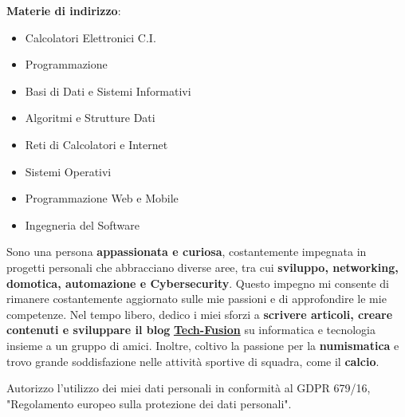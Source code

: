 

\textbf{Materie di indirizzo}: %
\begin{itemize}
    \item Calcolatori Elettronici C.I.
    \item Programmazione
    \item Basi di Dati e Sistemi Informativi
    \item Algoritmi e Strutture Dati
    \item Reti di Calcolatori e Internet
    \item Sistemi Operativi
    \item Programmazione Web e Mobile
    \item Ingegneria del Software
\end{itemize}





Sono una persona \textbf{appassionata e curiosa}, costantemente impegnata in progetti personali che abbracciano diverse aree, tra cui \textbf{sviluppo, networking, domotica, automazione e Cybersecurity}. Questo impegno mi consente di rimanere costantemente aggiornato sulle mie passioni e di approfondire le mie competenze. Nel tempo libero, dedico i miei sforzi a \textbf{scrivere articoli, creare contenuti e sviluppare il blog} \href{https://tech-fusion.it/}{\textbf{Tech-Fusion}} su informatica e tecnologia insieme a un gruppo di amici. Inoltre, coltivo la passione per la \textbf{numismatica} e trovo grande soddisfazione nelle attività sportive di squadra, come il \textbf{calcio}.



\divider

\footnotesize{Autorizzo l'utilizzo dei miei dati personali in conformità al GDPR 679/16, "Regolamento europeo sulla protezione dei dati personali".}

